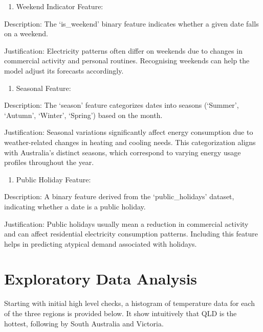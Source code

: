 \documentclass[
]{article}
\providecommand{\tightlist}{%
  \setlength{\itemsep}{0pt}\setlength{\parskip}{0pt}}
\begin{document}
\begin{enumerate}
\def\labelenumi{\arabic{enumi}.}
\setcounter{enumi}{2}
\tightlist
\item
  Weekend Indicator Feature:
\end{enumerate}

Description: The `is\_weekend' binary feature indicates whether a given
date falls on a weekend.

Justification: Electricity patterns often differ on weekends due to
changes in commercial activity and personal routines. Recognising
weekends can help the model adjust its forecasts accordingly.

\begin{enumerate}
\def\labelenumi{\arabic{enumi}.}
\setcounter{enumi}{3}
\tightlist
\item
  Seasonal Feature:
\end{enumerate}

Description: The `season' feature categorizes dates into seasons
(`Summer', `Autumn', `Winter', `Spring') based on the month.

Justification: Seasonal variations significantly affect energy
consumption due to weather-related changes in heating and cooling needs.
This categorization aligns with Australia's distinct seasons, which
correspond to varying energy usage profiles throughout the year.

\begin{enumerate}
\def\labelenumi{\arabic{enumi}.}
\setcounter{enumi}{4}
\tightlist
\item
  Public Holiday Feature:
\end{enumerate}

Description: A binary feature derived from the `public\_holidays'
dataset, indicating whether a date is a public holiday.

Justification: Public holidays usually mean a reduction in commercial
activity and can affect residential electricity consumption patterns.
Including this feature helps in predicting atypical demand associated
with holidays.

\section{Exploratory Data Analysis}\label{exploratory-data-analysis}

Starting with initial high level checks, a histogram of temperature data
for each of the three regions is provided below. It show intuitively
that QLD is the hottest, following by South Australia and Victoria.
\end{document}
